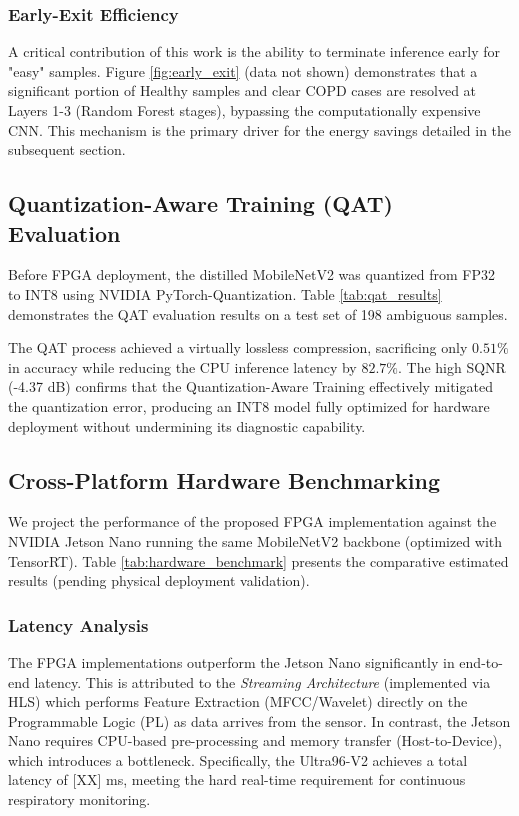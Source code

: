 

\subsubsection{Early-Exit Efficiency}
A critical contribution of this work is the ability to terminate inference early for "easy" samples. Figure \ref{fig:early_exit} (data not shown) demonstrates that a significant portion of Healthy samples and clear COPD cases are resolved at Layers 1-3 (Random Forest stages), bypassing the computationally expensive CNN. This mechanism is the primary driver for the energy savings detailed in the subsequent section.

\subsection{Quantization-Aware Training (QAT) Evaluation}
Before FPGA deployment, the distilled MobileNetV2 was quantized from FP32 to INT8 using NVIDIA PyTorch-Quantization. Table \ref{tab:qat_results} demonstrates the QAT evaluation results on a test set of 198 ambiguous samples.



The QAT process achieved a virtually lossless compression, sacrificing only $0.51\%$ in accuracy while reducing the CPU inference latency by $82.7\%$. The high SQNR (-4.37 dB) confirms that the Quantization-Aware Training effectively mitigated the quantization error, producing an INT8 model fully optimized for hardware deployment without undermining its diagnostic capability.

\subsection{Cross-Platform Hardware Benchmarking}
We project the performance of the proposed FPGA implementation against the NVIDIA Jetson Nano running the same MobileNetV2 backbone (optimized with TensorRT). Table \ref{tab:hardware_benchmark} presents the comparative estimated results (pending physical deployment validation).



\subsubsection{Latency Analysis}
The FPGA implementations outperform the Jetson Nano significantly in end-to-end latency. This is attributed to the \textit{Streaming Architecture} (implemented via HLS) which performs Feature Extraction (MFCC/Wavelet) directly on the Programmable Logic (PL) as data arrives from the sensor. In contrast, the Jetson Nano requires CPU-based pre-processing and memory transfer (Host-to-Device), which introduces a bottleneck. Specifically, the Ultra96-V2 achieves a total latency of [XX] ms, meeting the hard real-time requirement for continuous respiratory monitoring.

